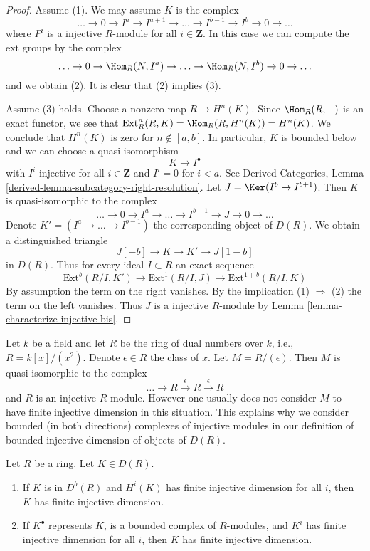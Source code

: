 \begin{proof}
Assume (1). We may assume $K$ is the complex
$$
\ldots \to 0 \to I^a \to I^{a + 1} \to \ldots \to
I^{b - 1} \to I^b \to 0 \to \ldots
$$
where $P^i$ is a injective $R$-module for all $i \in \mathbf{Z}$.
In this case we can compute the ext groups by the complex
$$
\ldots \to 0 \to \Hom_R(N, I^a) \to \ldots \to
\Hom_R(N, I^b) \to 0 \to \ldots
$$
and we obtain (2). It is clear that (2) implies (3).

\medskip\noindent
Assume (3) holds. Choose a nonzero map $R \to H^n(K)$. Since $\Hom_R(R, -)$
is an exact functor, we see that
$\text{Ext}^n_R(R, K) = \Hom_R(R, H^n(K)) = H^n(K)$.
We conclude that $H^n(K)$ is zero for $n \not \in [a, b]$.
In particular, $K$ is bounded below and we can choose a quasi-isomorphism
$$
K \to I^\bullet
$$
with $I^i$ injective for all $i \in \mathbf{Z}$ and
$I^i = 0$ for $i < a$. See Derived Categories, Lemma
\ref{derived-lemma-subcategory-right-resolution}.
Let $J = \Ker(I^b \to I^{b + 1})$. Then $K$ is quasi-isomorphic
to the complex
$$
\ldots \to 0 \to I^a \to \ldots \to I^{b - 1} \to J \to 0 \to \ldots
$$
Denote $K' = (I^a \to \ldots \to I^{b - 1})$ the corresponding object of
$D(R)$. We obtain a distinguished triangle
$$
J[-b] \to K \to K' \to J[1 - b]
$$
in $D(R)$. Thus for every ideal $I \subset R$ an exact sequence
$$
\text{Ext}^b(R/I, K') \to \text{Ext}^1(R/I, J) \to \text{Ext}^{1 + b}(R/I, K)
$$
By assumption the term on the right vanishes. By the implication
(1) $\Rightarrow$ (2) the term on the left vanishes. Thus $J$
is a injective $R$-module by
Lemma \ref{lemma-characterize-injective-bis}.
\end{proof}

\begin{example}
\label{example-ext-not-bounded-reversed}
Let $k$ be a field and let $R$ be the ring of dual numbers
over $k$, i.e., $R = k[x]/(x^2)$. Denote $\epsilon \in R$ the
class of $x$. Let $M = R/(\epsilon)$. Then $M$ is quasi-isomorphic
to the complex
$$
\ldots \to R \xrightarrow{\epsilon} R \xrightarrow{\epsilon} R
$$
and $R$ is an injective $R$-module. However one usually does not
consider $M$ to have finite injective dimension in this situation.
This explains why we consider bounded (in both directions) complexes
of injective modules in our definition of bounded injective dimension
of objects of $D(R)$.
\end{example}

\begin{lemma}
\label{lemma-finite-injective-dimension}
Let $R$ be a ring. Let $K \in D(R)$.
\begin{enumerate}
\item If $K$ is in $D^b(R)$ and $H^i(K)$ has finite injective dimension
for all $i$, then $K$ has finite injective dimension.
\item If $K^\bullet$ represents $K$, is a bounded complex of $R$-modules,
and $K^i$ has finite injective dimension for all $i$, then $K$ has finite
injective dimension.
\end{enumerate}
\end{lemma}

